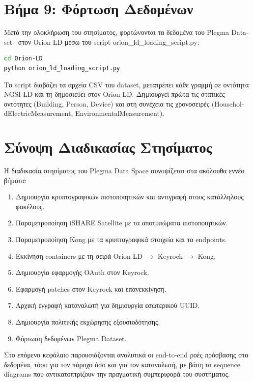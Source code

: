 \section{Βήμα 9: Φόρτωση Δεδομένων}
\label{sec:step9-data}

Μετά την ολοκλήρωση του στησίματος, φορτώνονται τα δεδομένα του
\textlatin{Plegma Dataset}~\cite{plegma2024} στον \textlatin{Orion-LD}
μέσω του \textlatin{script} \textlatin{orion\_ld\_loading\_script.py}:

\begin{lstlisting}[language=bash, caption={Data loading.}, stringstyle=\color{black}, keywordstyle=\color{black}]
cd Orion-LD
python orion_ld_loading_script.py
\end{lstlisting}

Το \textlatin{script} διαβάζει τα αρχεία \textlatin{CSV} του
\textlatin{dataset}, μετατρέπει κάθε γραμμή σε οντότητα
\textlatin{NGSI-LD} και τη δημοσιεύει στον \textlatin{Orion-LD}.
Δημιουργεί πρώτα τις στατικές οντότητες (\textlatin{Building},
\textlatin{Person}, \textlatin{Device}) και στη συνέχεια τις
χρονοσειρές (\textlatin{HouseholdElectricMeasurement},
\textlatin{EnvironmentalMeasurement}).

\section{Σύνοψη Διαδικασίας Στησίματος}
\label{sec:setup-summary}

Η διαδικασία στησίματος του \textlatin{Plegma Data Space} συνοψίζεται
στα ακόλουθα εννέα βήματα:

\begin{enumerate}
    \item Δημιουργία κρυπτογραφικών πιστοποιητικών και αντιγραφή
    στους κατάλληλους φακέλους.
    \item Παραμετροποίηση \textlatin{iSHARE Satellite} με τα
    αποτυπώματα πιστοποιητικών.
    \item Παραμετροποίηση \textlatin{Kong} με τα κρυπτογραφικά
    στοιχεία και τα \textlatin{endpoints}.
    \item Εκκίνηση \textlatin{containers} με τη σειρά
    \textlatin{Orion-LD} $\rightarrow$ \textlatin{Keyrock}
    $\rightarrow$ \textlatin{Kong}.
    \item Δημιουργία εφαρμογής \textlatin{OAuth} στον
    \textlatin{Keyrock}.
    \item Εφαρμογή \textlatin{patches} στον \textlatin{Keyrock}
    και επανεκκίνηση.
    \item Αρχική εγγραφή καταναλωτή για δημιουργία εσωτερικού
    \textlatin{UUID}.
    \item Δημιουργία πολιτικής εκχώρησης εξουσιοδότησης.
    \item Φόρτωση δεδομένων \textlatin{Plegma Dataset}.
\end{enumerate}

Στο επόμενο κεφάλαιο παρουσιάζονται αναλυτικά οι
\textlatin{end-to-end} ροές πρόσβασης στα δεδομένα, τόσο για
τον πάροχο όσο και για τον καταναλωτή, με βάση τα
\textlatin{sequence diagrams} που αντικατοπτρίζουν την πραγματική
συμπεριφορά του συστήματος.
